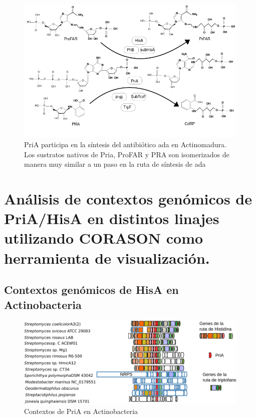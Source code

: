 \documentclass[12pt,twoside]{reedthesis}
\begin{document}
  \begin{figure}[h!tbp]
  \centering
  \includegraphics[angle = 0,scale = 0.6]{chapter4/ada.png}
  \caption[PriA participa en la síntesis del antibiótico {ada} en {Actinomadura} ]{\footnotesize{PriA participa en la síntesis del antibiótico {ada} en {Actinomadura}. Los sustratos nativos de Pria, ProFAR y PRA son isomerizados de manera muy similar a un paso en la ruta de síntesis de {ada} }}
  \label{fig:ada}
  \end{figure}
  
  \clearpage
  
  \section{Análisis de contextos genómicos de PriA/HisA en distintos
  linajes utilizando CORASON como herramienta de
  visualización.}\label{analisis-de-contextos-genomicos-de-priahisa-en-distintos-linajes-utilizando-corason-como-herramienta-de-visualizacion.}
  
  \subsection{Contextos genómicos de HisA en
  Actinobacteria}\label{contextos-genomicos-de-hisa-en-actinobacteria}
  
  \begin{figure}[h!tbp]
  \centering
  \includegraphics[angle = 0,scale = 0.9]{chapter4/CORASON/ActinoCORASON.pdf}
  \caption[Contextos de PriA en Actinobacteria]{\footnotesize{Contextos de PriA en Actinobacteria}}
  \label{fig:ActinoCORASON}
  \end{figure}
  
\end{document}
